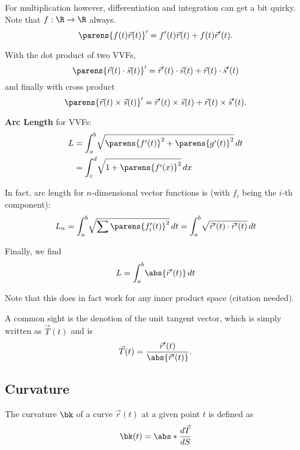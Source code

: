 \documentclass{article}
\begin{document}
For multiplication however, differentiation and integration can get a bit quirky. Note that $f: \R \to \R$ always.
\begin{equation}
  \parens{f(t)\vec{r}(t)}' = f'(t)\vec{r}(t) + f(t)\vec{r}'(t).
\end{equation}

With the dot product of two VVFs,
\begin{equation}
  \parens{\vec{r}(t) \cdot \vec{s}(t)}' = \vec{r}'(t) \cdot \vec{s}(t) + \vec{r}(t) \cdot \vec{s}'(t)
\end{equation}
\indent
and finally with cross product
\begin{equation}
  \parens{\vec{r}(t) \times \vec{s}(t)}' = \vec{r}'(t) \times \vec{s}(t) + \vec{r}(t) \times \vec{s}'(t).
\end{equation}

\textbf{Arc Length} for VVFs:
\begin{align}
  L &= \int_{a}^{b}\!\sqrt{\parens{f'(t)}^{2} + \parens{g'(t)}^{2}}\,dt\\
  &= \int_{c}^{d}\! \sqrt{1 + \parens{f'(x)}^{2}}\,dx
\end{align}

In fact, arc length for $n$-dimensional vector functions is (with $f_{i}$ being the $i$-th component):
\begin{equation}
  L_{n} = \int_{a}^{b} \! \sqrt{\sum \parens{f_{i}'(t)}^{2}} \, dt = \int_{a}^{b} \! \sqrt{\vec{r}'(t) \cdot \vec{r}'(t)} \, dt
\end{equation}

Finally, we find
\begin{equation}
  L = \int_{a}^{b} \! \abs{\vec{r}'(t)} \, dt
\end{equation}

Note that this does in fact work for any inner product space (citation needed).

A common sight is the denotion of the unit tangent vector, which is simply written as $\vec{T}(t)$ and is
\begin{equation*}
  \vec{T}(t) = \frac{\vec{r}'(t)}{\abs{\vec{r}'(t)}}.
\end{equation*}

\subsection{Curvature}
The curvature $\bk$ of a curve $\vec{r}(t)$ at a given point $t$ is defined as
\begin{equation}
  \bk(t) = \abs*{\frac{d\vec{T}}{dS}}
\end{equation}
\end{document}

